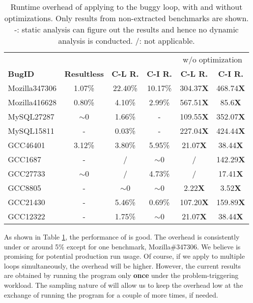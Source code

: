 \begin{table}
  \centering
  \scriptsize
  \newcommand{\Yes}[1]{\checkmark{}$_#1$}
  \newcommand{\No}[0]{-}
  \begin{tabular}{lccccc}
    \toprule
	    & \multicolumn{3}{c}{\Tool} & \multicolumn{2}{c}{w/o optimization} \\
     \cmidrule(lr){2-4}
     \cmidrule(lr){5-6}
     {\bf BugID}  & {\bf Resultless}  &  {\bf C-L R. } & {\bf C-I R. }  & {\bf C-L R.}  & {\bf C-I R. } \\
    \midrule
    Mozilla347306 &  1.07\%           &  22.40\%       &  10.17\%       & 304.37{\bf X} & 468.74{\bf X} \\ 
    Mozilla416628 &  0.80\%           &  4.10\%        &  2.99\%        & 567.51{\bf X} & 85.6{\bf X} \\
    \midrule
     MySQL27287   & $\sim$0           &   1.66\%       &   -            & 109.55{\bf X} & 352.07{\bf X} \\
     MySQL15811   &  -                &   0.03\%       &   -            & 227.04{\bf X} & 424.44{\bf X} \\
    \midrule
      GCC46401    & 3.12\%         & 3.80\%            &  5.95\%        & 21.07{\bf X}  & 38.44{\bf X}\\ 
      GCC1687     & -              & /                 &  $\sim$0       &   /           & 142.29{\bf X} \\
      GCC27733    & $\sim$0        & /                 &  4.73\%        &   /           & 17.41{\bf X}     \\
      GCC8805     & -              & $\sim$0           & $\sim$0        & 2.22{\bf X}   &  3.52{\bf X}\\
      GCC21430    & -              & 5.46\%            &   0.69\%       & 107.20{\bf X} & 159.89{\bf X} \\
      GCC12322    & -              & 1.75\%            &  $\sim$0       & 21.07{\bf X}  & 38.44{\bf X} \\
   \bottomrule
   \end{tabular}
  \caption{Runtime overhead of applying \Tool to the buggy loop, with and
    without optimizations. 
    Only results from non-extracted benchmarks are shown. 
  -: static analysis can figure out the results and hence no dynamic analysis is conducted.
  /: not applicable. }
  \label{tab:6_performance}
\end{table}


As shown in Table \ref{tab:6_performance}, 
the performance of \Tool is good. The overhead is consistently under or around 5\% 
except for one benchmark, Mozilla\#347306. We believe \Tool is promising for potential production
run usage. Of course, if we apply \Tool to multiple loops simultaneously,
the overhead will be higher. However, the current results are obtained by running the
program only \textbf{once} under the problem-triggering workload. The sampling nature
of \Tool will allow us to keep the overhead low at the exchange of running the program for
a couple of more times, if needed.

